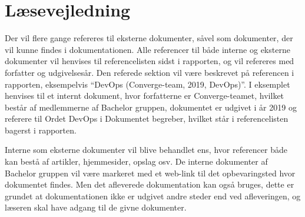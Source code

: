 \chapter{Læsevejledning}

Der vil flere gange refereres til eksterne dokumenter, såvel som dokumenter, der vil kunne findes i dokumentationen. Alle referencer til både interne og eksterne dokumenter vil henvises til referencelisten sidst i rapporten, og vil refereres med forfatter og udgivelsesår. Den referede sektion vil være beskrevet på referencen i rapporten, eksempelvis ``DevOps (Converge-team, 2019, DevOps)''. I eksemplet henvises til et internt dokument, hvor forfatterne er Converge-teamet, hvilket består af medlemmerne af Bachelor gruppen, dokumentet er udgivet i år 2019 og referere til Ordet DevOps i Dokumentet begreber, hvilket står i referencelisten bagerst i rapporten.

Interne som eksterne dokumenter vil blive behandlet ens, hvor referencer både kan bestå af artikler, hjemmesider, opslag osv. De interne dokumenter af Bachelor gruppen vil være markeret med et web-link til det opbevaringsted hvor dokumentet findes. Men det afleverede dokumentation kan også bruges, dette er grundet at dokumentationen ikke er udgivet andre steder end ved afleveringen, og læseren skal have adgang til de givne dokumenter.


